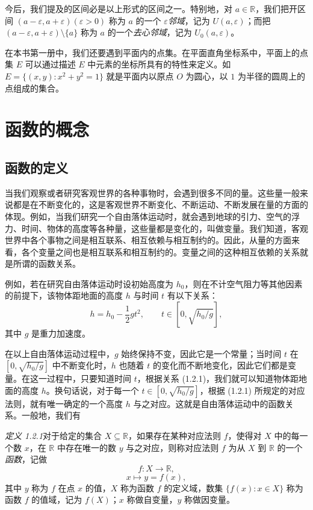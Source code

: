 \documentclass[UTF8,12pt,a4paper,fontset=fandol]{ctexbook}
\begin{document}
今后，我们提及的区间必是以上形式的区间之一。特别地，对 $a\in\mathbb{R}$，我们把开区间 $(a-\varepsilon,a+\varepsilon)(\varepsilon>0)$ 称为 $a$ 的一个 $\varepsilon$\emph{邻域}，记为 $U(a,\varepsilon)$；而把 $(a-\varepsilon,a+\varepsilon)\setminus\{a\}$ 称为 $a$ 的一个\emph{去心邻域}，记为 $U_0(a,\varepsilon)$。

在本书第一册中，我们还要遇到平面内的点集。在平面直角坐标系中，平面上的点集 $E$ 可以通过描述 $E$ 中元素的坐标所具有的特性来定义。如 $E=\{(x,y):x^2+y^2=1\}$ 就是平面内以原点 $O$ 为圆心，以 $1$ 为半径的圆周上的点组成的集合。

\section{函数的概念}

\subsection{函数的定义}

当我们观察或者研究客观世界的各种事物时，会遇到很多不同的量。这些量一般来说都是在不断变化的，这是客观世界不断变化、不断运动、不断发展在量的方面的体现。例如，当我们研究一个自由落体运动时，就会遇到地球的引力、空气的浮力、时间、物体的高度等各种量，这些量都是变化的，叫做变量。我们知道，客观世界中各个事物之间是相互联系、相互依赖与相互制约的。因此，从量的方面来看，各个变量之间也是相互联系和相互制约的。变量之间的这种相互依赖的关系就是所谓的函数关系。

例如，若在研究自由落体运动时设初始高度为 $h_0$，则在不计空气阻力等其他因素的前提下，该物体距地面的高度 $h$ 与时间 $t$ 有以下关系：
\begin{equation}
  h=h_0-\frac12gt^2,\qquad t\in[0,\sqrt{h_0/g}],
  \tag{1.2.1}
\end{equation}
其中 $g$ 是重力加速度。

在以上自由落体运动过程中，$g$ 始终保持不变，因此它是一个常量；当时间 $t$ 在 $[0,\sqrt{h_0/g}]$ 中不断变化时，$h$ 也随着 $t$ 的变化而不断地变化，因此它们都是变量。在这一过程中，只要知道时间 $t$，根据关系 (1.2.1)，我们就可以知道物体距地面的高度 $h$。换句话说，对于每一个 $t\in[0,\sqrt{h_0/g}]$，根据 (1.2.1) 所规定的对应法则，就有唯一确定的一个高度 $h$ 与之对应。这就是自由落体运动中的函数关系。一般地，我们有

\noindent\emph{定义 1.2.1}\quad 对于给定的集合 $X\subseteq\mathbb{R}$，如果存在某种对应法则 $f$，使得对 $X$ 中的每一个数 $x$，在 $\mathbb{R}$ 中存在唯一的数 $y$ 与之对应，则称对应法则 $f$ 为从 $X$ 到 $\mathbb{R}$ 的一个\emph{函数}，记做
\[
  f:X\to\mathbb{R},
\]
\[
  x\mapsto y=f(x),
\]
其中 $y$ 称为 $f$ 在点 $x$ 的值，$X$ 称为函数 $f$ 的定义域，数集 $\{f(x):x\in X\}$ 称为函数 $f$ 的值域，记为 $f(X)$；$x$ 称做自变量，$y$ 称做因变量。
\end{document}
